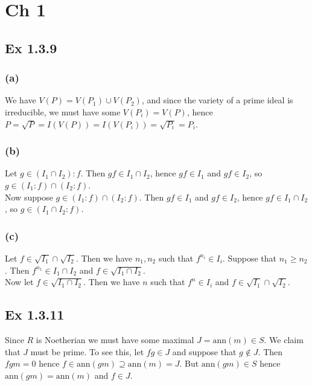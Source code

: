\documentclass{article}
\theoremstyle{definition}
\newcommand{\ann}{\text{ann}}
\begin{document}
\section*{Ch 1}

\subsection*{Ex 1.3.9}

\subsubsection*{(a)}

We have $V(P) = V(P_1) \cup V(P_2)$, and since the variety of a prime ideal is
irreducible, we must have some $V(P_i) = V(P)$, hence $P = \sqrt{P} = I(V(P)) =
I(V(P_i)) = \sqrt{P_i} = P_i$.

\subsubsection*{(b)}

Let $g \in (I_1 \cap I_2) : f$. Then $gf \in I_1 \cap I_2$, hence $gf \in I_1$
and $gf \in I_2$, so $g \in (I_1 : f) \cap (I_2 : f)$. \\

Now suppose $g \in (I_1 : f) \cap (I_2 : f)$. Then $gf \in I_1$ and $gf \in
I_2$, hence $gf \in I_1 \cap I_2$, so $g \in (I_1 \cap I_2 : f)$.

\subsubsection*{(c)}

Let $f \in \sqrt{I_1} \cap \sqrt{I_2}$. Then we have $n_1, n_2$ such that
$f^{n_i} \in I_i$. Suppose that $n_1 \geq n_2$. Then $f^{n_1} \in I_1 \cap I_2$
and $f \in \sqrt{I_1 \cap I_2}$. \\

Now let $f \in \sqrt{I_1 \cap I_2}$. Then we have $n$ such that $f^{n} \in I_i$
and $f \in \sqrt{I_1} \cap \sqrt{I_2}$. 

\subsection*{Ex 1.3.11}

Since $R$ is Noetherian we must have some maximal $J = \ann(m) \in S$. We claim
that $J$ must be prime. To see this, let $fg \in J$ and suppose that $g \not
\in J$. Then $fg m = 0$ hence $f \in \ann(gm) \supseteq \ann(m) = J$. But
$\ann(gm) \in S$ hence $\ann(gm) = \ann(m)$ and $f \in J$.
\end{document}
